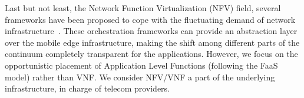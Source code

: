 Last but not least, the Network Function Virtualization (NFV) field, several frameworks have been proposed to cope with the fluctuating demand of network infrastructure~\cite{etsimano17,cloudify14}. These orchestration frameworks can provide an abstraction layer over the mobile edge infrastructure, making the shift among different parts of the continuum completely transparent for the applications. However, we focus on the opportunistic placement of Application Level Functions (following the FaaS model) rather than VNF. We consider NFV/VNF a part of the underlying infrastructure, in charge of telecom providers.





